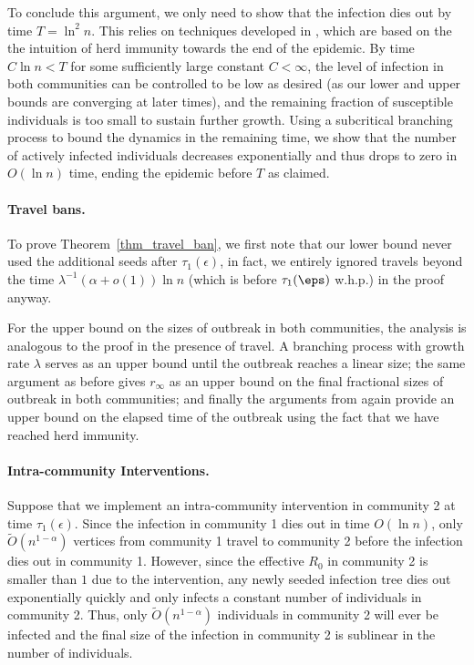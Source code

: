 \documentclass[11pt]{article}
\begin{document}
To conclude this argument, we only need to show that the infection dies out by time $T = \ln^2 n$. This relies on techniques developed in \cite{borgs2024lawlargenumberssir}, which are based on the the intuition of herd immunity towards the end of the epidemic. By time $C \ln n < T$ for some sufficiently large constant $C < \infty$, the level of infection in both communities can be controlled to be low as desired (as our lower and upper bounds are converging at later times), and the remaining fraction of susceptible individuals is too small to sustain further growth. Using a subcritical branching process to bound the dynamics in the remaining time, we show that the number of actively infected individuals decreases exponentially and thus drops to zero in $O(\ln n)$ time, ending the epidemic before $T$ as claimed.

\paragraph{Travel bans.}
To prove Theorem~\ref{thm_travel_ban}, we first note that our lower bound never used the additional seeds after $\tau_{1}(\epsilon)$, in fact, we entirely ignored travels beyond the time $\lambda^{-1}(\alpha+o(1))\ln n $ (which is before $\tau_1(\eps)$ w.h.p.) in the proof anyway.
    
    For the upper bound on the sizes of outbreak in both communities, the analysis is analogous to the proof in the presence of travel.  A branching process with growth rate $\lambda$ serves as an upper bound until the outbreak reaches a linear size; the same argument as before gives $r_\infty$ as an upper bound on the final fractional sizes of outbreak in both communities; and finally the arguments from \cite{borgs2024lawlargenumberssir} again provide an upper bound on the elapsed time of the outbreak using the fact that we have reached herd immunity.
    
\paragraph{Intra-community Interventions.}
Suppose that we implement an intra-community intervention in community 2 at time $\tau_1(\epsilon)$. Since the infection in community 1 dies out in time $O(\ln n)$, only $\tilde O(n^{1-\alpha})$ vertices from community 1 travel to community 2 before the infection dies out in community 1. However, since the effective $R_0$ in community 2 is smaller than $1$ due to the intervention, any newly seeded infection tree dies out exponentially quickly and only infects a constant number of individuals in community 2. Thus, only $\tilde O(n^{1-\alpha})$ individuals in community 2 will ever be infected and the final size of the infection in community 2 is sublinear in the number of individuals.
\end{document}
